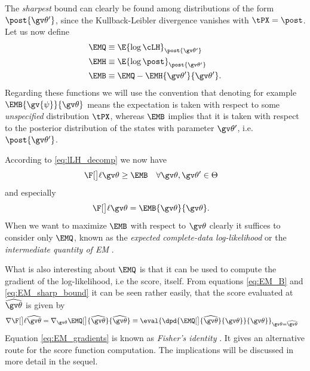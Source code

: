 The \emph{sharpest} bound can clearly be found among
distributions of the form $\post{\Th'}$, since the Kullback-Leibler divergence 
vanishes with $\tPX= \post$.
Let us now define
\begin{align}
	\EMQ &\equiv \E{\log\cLH}_{\post{\Th'}} \label{eq:EM_Q}\\
	\EMH &\equiv \E{\log\post}_{\post{\Th'}} \label{eq:EM_H}\\
	\EMB &\equiv \EMQ - \EMH{\Th'}{\Th'} \label{eq:EM_B}.
\end{align}
Regarding these functions we will use the convention that denoting for example $\EMB{\gv{\psi}}{\Th}$ means the
expectation is taken with respect to some \emph{unspecified} distribution $\tPX$, whereas $\EMB$ implies
that it is taken with respect to the posterior distribution of the states with parameter $\Th'$, i.e. $\post{\Th'}$. 


According to \eqref{eq:lLH_decomp} we now have
\begin{align}
	\lLH & \geq \EMB \quad \forall \Th,\Th' \in \Theta
	\label{eq:EM_LB}
\end{align}
and especially
\begin{align}
	\lLH & = \EMB{\Th}{\Th}.
	\label{eq:EM_sharp_bound}
\end{align}
When we want to maximize $\EMB$ with respect to $\Th$
clearly it suffices to consider
only $\EMQ$, known as the \emph{expected complete-data log-likelihood}
or the \emph{intermediate quantity of EM} \parencite{Cappe2005,Bishop2006}.

What is also interesting about $\EMQ$ is that it can be used to compute the gradient of the log-likelihood, i.e
the score, itself. From equations \eqref{eq:EM_B}
and \eqref{eq:EM_sharp_bound} it can be seen rather easily, that  
the score evaluated at $\widehat{\Th}$ is given by
\begin{align}
		\score[\widehat\Th]&=
		\nabla_{\Th}\EMQ[\big]{\widehat\Th}{\widehat\Th}
		\equiv\eval{\dpd{ \EMQ[\big]{\widehat\Th}{\Th}}{\Th}}_{\Th=\widehat\Th} \label{eq:EM_gradients}
\end{align} 
Equation \eqref{eq:EM_gradients} is known as \emph{Fisher's identity} \parencite{Cappe2005}. It gives
an alternative route for the score function computation.
The implications will be discussed in more detail in the sequel.

